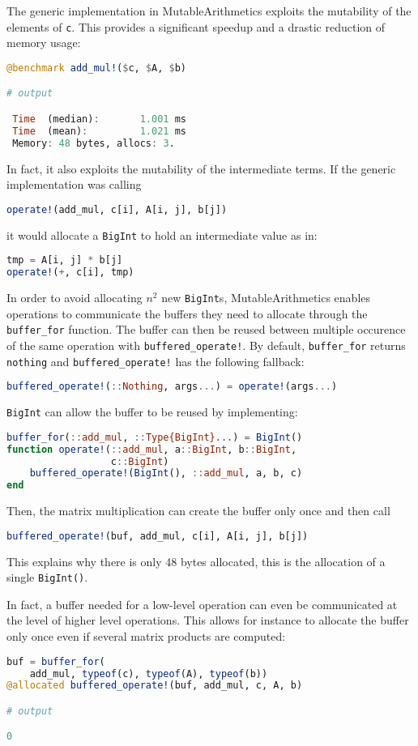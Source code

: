 \documentclass{juliacon}
\newcommand{\ma}{MutableArithmetics}
\begin{document}
The generic implementation in \ma{} exploits the mutability of the elements of \lstinline|c|.
This provides a significant speedup and a drastic reduction of memory usage:
\begin{lstlisting}[language = Julia]
@benchmark add_mul!($c, $A, $b)

# output

 Time  (median):       1.001 ms
 Time  (mean):         1.021 ms
 Memory: 48 bytes, allocs: 3.
\end{lstlisting}

In fact, it also exploits the mutability of the intermediate terms.
If the generic implementation was calling
\begin{lstlisting}[language = Julia]
operate!(add_mul, c[i], A[i, j], b[j])
\end{lstlisting}
it would allocate a \lstinline|BigInt| to hold an intermediate value as in:
\begin{lstlisting}[language = Julia]
tmp = A[i, j] * b[j]
operate!(+, c[i], tmp)
\end{lstlisting}
In order to avoid allocating $n^2$ new \lstinline|BigInt|s,
\ma{} enables operations to communicate the buffers they need to allocate through the \lstinline|buffer_for| function.
The buffer can then be reused between multiple occurence of the same operation with \lstinline|buffered_operate!|.
By default, \lstinline|buffer_for| returns \lstinline|nothing|
and \lstinline|buffered_operate!| has the following fallback:
\begin{lstlisting}[language = Julia]
buffered_operate!(::Nothing, args...) = operate!(args...)
\end{lstlisting}
\lstinline|BigInt| can allow the buffer to be reused by implementing:
\begin{lstlisting}[language = Julia]
buffer_for(::add_mul, ::Type{BigInt}...) = BigInt()
function operate!(::add_mul, a::BigInt, b::BigInt,
                  c::BigInt)
    buffered_operate!(BigInt(), ::add_mul, a, b, c)
end
\end{lstlisting}
Then, the matrix multiplication can create the buffer
only once and then call
\begin{lstlisting}[language = Julia]
buffered_operate!(buf, add_mul, c[i], A[i, j], b[j])
\end{lstlisting}
This explains why there is only 48 bytes allocated, this is the
allocation of a single \lstinline|BigInt()|.

In fact, a buffer needed for a low-level operation can even be communicated
at the level of higher level operations.
This allows for instance to allocate the buffer only once even if
several matrix products are computed:
\begin{lstlisting}[language = Julia]
buf = buffer_for(
    add_mul, typeof(c), typeof(A), typeof(b))
@allocated buffered_operate!(buf, add_mul, c, A, b)

# output

0
\end{lstlisting}
\end{document}
